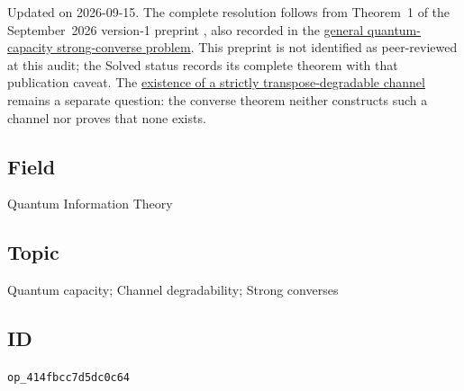 Updated on 2026-09-15. The complete resolution follows from Theorem~1 of the September~2026 version-1 preprint , also recorded in the \href{https://qiqc-op.com/problem/op_38f9dbb6c3f92b0c/}{general quantum-capacity strong-converse problem}. This preprint is not identified as peer-reviewed at this audit; the Solved status records its complete theorem with that publication caveat. The \href{https://qiqc-op.com/problem/op_7e7e4a25fef5c994/}{existence of a strictly transpose-degradable channel} remains a separate question: the converse theorem neither constructs such a channel nor proves that none exists.

\subsection*{Field}

Quantum Information Theory

\subsection*{Topic}

Quantum capacity; Channel degradability; Strong converses

\subsection*{ID}

\texttt{op\_414fbcc7d5dc0c64}
